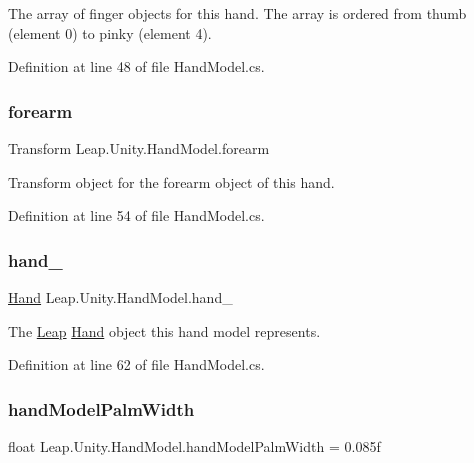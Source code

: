 The array of finger objects for this hand. The array is ordered from thumb (element 0) to pinky (element 4). 

Definition at line 48 of file Hand\+Model.\+cs.

\mbox{\label{class_leap_1_1_unity_1_1_hand_model_a50b236af9574f8f2b5e9fedba8aa5ff0}} 
\subsubsection{\texorpdfstring{forearm}{forearm}}
{\footnotesize\ttfamily Transform Leap.\+Unity.\+Hand\+Model.\+forearm}

Transform object for the forearm object of this hand. 

Definition at line 54 of file Hand\+Model.\+cs.

\mbox{\label{class_leap_1_1_unity_1_1_hand_model_a5021ce9e2077ee8616ac608409133d5c}} 
\subsubsection{\texorpdfstring{hand\_}{hand\_}}
{\footnotesize\ttfamily \mbox{\hyperlink{class_leap_1_1_hand}{Hand}} Leap.\+Unity.\+Hand\+Model.\+hand\+\_\+\hspace{0.3cm}{\ttfamily [protected]}}

The \mbox{\hyperlink{namespace_leap_1_1_unity_1_1_leap}{Leap}} \mbox{\hyperlink{class_leap_1_1_hand}{Hand}} object this hand model represents. 

Definition at line 62 of file Hand\+Model.\+cs.

\mbox{\label{class_leap_1_1_unity_1_1_hand_model_ad8d407041200583ebc8e414fb903b87c}} 
\subsubsection{\texorpdfstring{handModelPalmWidth}{handModelPalmWidth}}
{\footnotesize\ttfamily float Leap.\+Unity.\+Hand\+Model.\+hand\+Model\+Palm\+Width = 0.\+085f}

